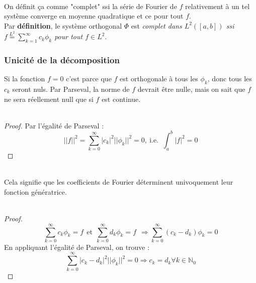 \documentclass[11pt, a4paper, openany]{book}
\newcommand{\serie}{\sum_{k=1}^\infty}
\newcommand{\series}{\sum_{k=0}^\infty}
\begin{document}
		\theor{Si $f_{L^2} = \serie c_k\phi_k$ alors $\serie |c_k|^2||\phi_k||^2 \leq ||f||^2$}\ \\
									
		On définit ça comme "complet" ssi la série de Fourier de $f$ relativement à un tel système converge en moyenne quadratique et ce pour tout $f$.\\
									
		Par \textbf{définition}, le système orthogonal $\Phi$ est \textit{complet dans $L^2([a,b])$ ssi $f \overset{L^2}{=}\serie c_k\phi_k$ pour tout $f \in L^2$}.
									
									
		\subsubsection*{Unicité de la décomposition}
		Si la fonction $f = 0$ c'est parce que $f$ est orthogonale à tous les $\phi_k$, donc tous les $c_k$ seront nuls. Par Parseval, la norme de $f$ devrait être nulle, mais on sait que $f$ ne sera réellement null que si $f$ est continue.\\
									
		\ \\
									
		\begin{proof}
			Par l'égalité de Parseval :
			\begin{equation}
				||f||^2 = \series |c_k|^2||\phi_k||^2  = 0,\ \text{i.e. }\ \int_a^b |f|^2 = 0
			\end{equation}
		\end{proof}
									
		\ \\
		Cela signifie que les coefficients de Fourier déterminent univoquement leur fonction génératrice.\\
									
									
		\ \\
		\begin{proof}
			\begin{equation}
				\series c_k\phi_k = f\ \ \text{et}\ \ \series d_k\phi_k = f\ \ \Rightarrow \series (c_k-d_k)\phi_k = 0
			\end{equation}
			En appliquant l'égalité de Parseval, on trouve : 
			\begin{equation}
				\series |c_k-d_k|^2||\phi_k||^2 = 0 \Rightarrow c_k = d_k \forall k \in \mathbb{N}_0
			\end{equation}
		\end{proof}
		\setcounter{subsection}{3}
\end{document}
